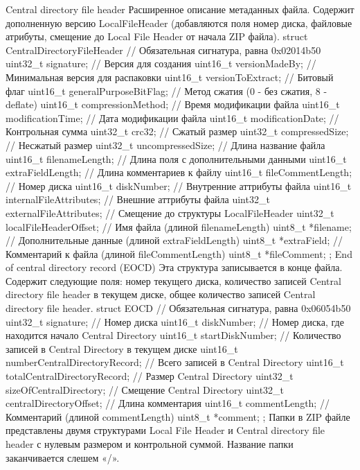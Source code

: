 Central directory file header
Расширенное описание метаданных файла. Содержит дополненную версию LocalFileHeader (добавляются поля номер диска, файловые атрибуты, смещение до Local File Header от начала ZIP файла).
struct CentralDirectoryFileHeader
{
    // Обязательная сигнатура, равна 0x02014b50 
    uint32_t signature;
    // Версия для создания
    uint16_t versionMadeBy;
    // Минимальная версия для распаковки
    uint16_t versionToExtract;
    // Битовый флаг
    uint16_t generalPurposeBitFlag;
    // Метод сжатия (0 - без сжатия, 8 - deflate)
    uint16_t compressionMethod;
    // Время модификации файла
    uint16_t modificationTime;
    // Дата модификации файла
    uint16_t modificationDate;
    // Контрольная сумма
    uint32_t crc32;
    // Сжатый размер
    uint32_t compressedSize;
    // Несжатый размер
    uint32_t uncompressedSize;
    // Длина название файла
    uint16_t filenameLength;
    // Длина поля с дополнительными данными
    uint16_t extraFieldLength;
    // Длина комментариев к файлу
    uint16_t fileCommentLength;
    // Номер диска
    uint16_t diskNumber;
    // Внутренние аттрибуты файла
    uint16_t internalFileAttributes;
    // Внешние аттрибуты файла
    uint32_t externalFileAttributes;
    // Смещение до структуры LocalFileHeader
    uint32_t localFileHeaderOffset;
    // Имя файла (длиной filenameLength)
    uint8_t *filename;
    // Дополнительные данные (длиной extraFieldLength)
    uint8_t *extraField;
    // Комментарий к файла (длиной fileCommentLength)
    uint8_t *fileComment;
};
End of central directory record (EOCD)
Эта структура записывается в конце файла. Содержит следующие поля: номер текущего диска, количество записей Central directory file header в текущем диске, общее количество записей Central directory file header.
struct EOCD
{
    // Обязательная сигнатура, равна 0x06054b50
    uint32_t signature;
    // Номер диска
    uint16_t diskNumber;
    // Номер диска, где находится начало Central Directory
    uint16_t startDiskNumber;
    // Количество записей в Central Directory в текущем диске
    uint16_t numberCentralDirectoryRecord;
    // Всего записей в Central Directory
    uint16_t totalCentralDirectoryRecord;
    // Размер Central Directory
    uint32_t sizeOfCentralDirectory;
    // Смещение Central Directory
    uint32_t centralDirectoryOffset;
    // Длина комментария
    uint16_t commentLength;
    // Комментарий (длиной commentLength)
    uint8_t *comment;
};
Папки в ZIP файле представлены двумя структурами Local File Header и Central directory file header с нулевым размером и контрольной суммой. Название папки заканчивается слешем «/».


